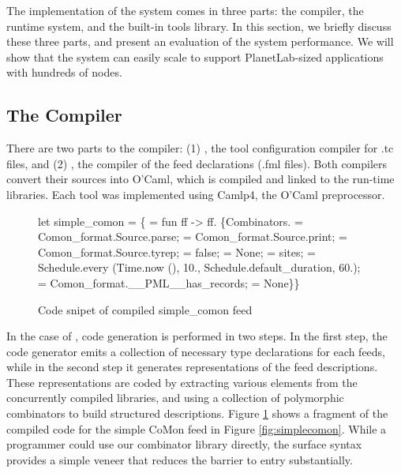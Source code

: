 The implementation of the \padsd{} system comes in
three parts: the compiler, the runtime system, and the
built-in tools library. In this section, we briefly
discuss these three parts, and present 
an evaluation of the system performance. 
We will show that the system can easily scale
to support PlanetLab-sized applications with 
hundreds of nodes. 

\subsection{The Compiler}
There are two parts to the \padsd{} compiler:
(1) , the tool configuration compiler for .tc files, 
and (2) , the
compiler of the feed declarations (.fml files). Both compilers
convert their sources into O'Caml, which is compiled and
linked to the run-time libraries.  Each tool was implemented using 
Camlp4, the O'Caml preprocessor. 

\begin{figure}[th]
\centering
\begin{codebox}
let simple_comon =
\{ = fun ff ->
 ff.
 \{Combinators. = Comon_format.Source.parse;
   = Comon_format.Source.print;
   = Comon_format.Source.tyrep; 
   = false;
   = None; 
   = sites;
   =
    Schedule.{\kw every} (Time.now (), 10., 
                    Schedule.default_duration, 60.);
   = Comon_format.__PML__has_records; 
   = None\}\}
\end{codebox}
\caption{Code snipet of compiled simple\_comon feed}\label{fig:compiledcomon}
\end{figure}

In the case of , code generation is performed in two steps.
In the first step, the code generator emits a collection of
necessary type declarations for each feeds, while in the second step
it generates representations of the feed descriptions.  These representations
are coded by extracting various elements from the concurrently
compiled \padsml{} libraries,
and using a collection of polymorphic combinators to build structured 
descriptions.  Figure \ref{fig:compiledcomon} shows a fragment of
the compiled code for
the simple CoMon feed in Figure \ref{fig:simplecomon}.
While a programmer could use our combinator library directly, the
surface syntax provides a simple veneer that reduces the barrier to
entry substantially.

